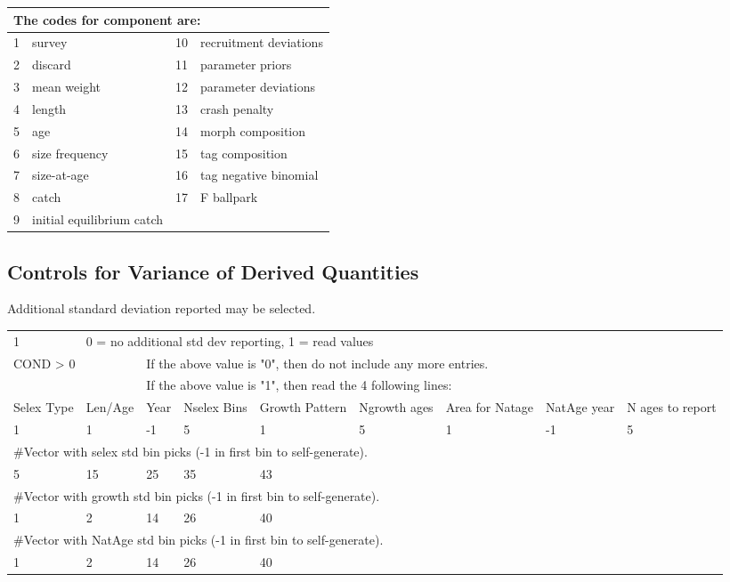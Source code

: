 \begin{center}
	\begin{longtable}{p{1cm} p{6cm} p{1cm} p{6cm} }
		\multicolumn{4}{l}{The codes for component are:}\\
		\hline
		1 & survey & 10 & recruitment deviations \\	
		2 & discard & 11 & parameter priors\\		
		3 &  mean weight & 12 & parameter deviations\\	
		4 & length & 13 & crash penalty\\		
		5 & age & 14 & morph composition\\
		6 & size frequency & 15 & tag composition\\		
		7 & size-at-age & 16 & tag negative binomial\\
		8 & catch & 17 & F ballpark\\		
		9 & initial equilibrium catch & & \\
		\hline
	\end{longtable}
\end{center}



\subsection{Controls for Variance of Derived Quantities}
Additional standard deviation reported may be selected.
\begin{center}
	\begin{longtable}{p{1cm} p{1.2cm} p{1.2cm} p{1.2cm} p{1.2cm} p{1.2cm} p{1.5cm} p{1.5cm} p{1.8cm}}
		\hline
		1 & \multicolumn{8}{l}{0 = no additional std dev reporting, 1 = read values}\\
		\multicolumn{2}{l}{COND > 0} & \multicolumn{7}{l}{If the above value is "0", then do not include any more entries.}\\
		  & & \multicolumn{7}{l}{If the above value is "1", then read the 4 following lines:}\\
		Selex Type & Len/Age & Year & Nselex Bins & Growth Pattern & Ngrowth ages & Area for Natage & NatAge year  & N ages to report\\
		\hline
		1 & 1 & -1 & 5 & 1 & 5 & 1 & -1 & 5\\ 
		\hline
		\multicolumn{9}{l}{\#Vector with selex std bin picks (-1 in first bin to self-generate).} \\
		5 & 15 & 25 & 35 & 43 & & & & \\
		\hline
		\multicolumn{9}{l}{\#Vector with growth std bin picks (-1 in first bin to self-generate).} \\	
		1 & 2 & 14 & 26 & 40 & & & & \\	
		\hline
		\multicolumn{9}{l}{\#Vector with NatAge std bin picks (-1 in first bin to self-generate).} \\	
		1 & 2 & 14 & 26 & 40 & & & & \\
		\hline			
	\end{longtable}
\end{center}


